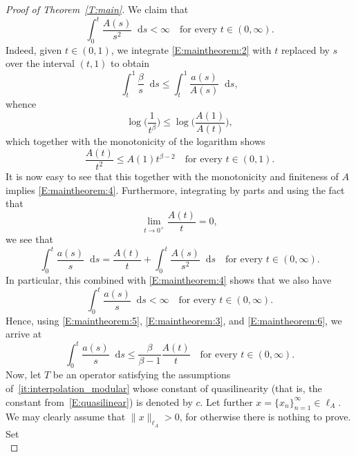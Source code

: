 \documentclass[nointlimits]{amsart}
\numberwithin{equation}{section}
\theoremstyle{plain}
\theoremstyle{definition}
\newcommand{\lA}{\ell_A}
\newcommand*\dd{\mathop{}\!\mathrm{d}}
\begin{document}
\begin{proof}[Proof of Theorem~\ref{T:main}]
We claim that
\begin{equation}\label{E:maintheorem:4}
    \int_0^t \frac{A(s)}{s^2} \dd s < \infty \quad \text{for every $t\in(0, \infty)$}.
\end{equation}
Indeed, given $t\in(0, 1)$, we integrate \eqref{E:maintheorem:2} with $t$ replaced by $s$ over the interval $(t, 1)$ to obtain
\begin{equation*}
    \int_t^1 \frac{\beta}{s} \dd s \leq \int_t^1 \frac{a(s)}{A(s)} \dd s,
\end{equation*}
whence
\begin{equation*}
    \log\Big( \frac1{t^\beta} \Big) \leq \log\Big( \frac{A(1)}{A(t)} \Big),
\end{equation*}
which together with the monotonicity of the logarithm shows
\begin{equation*}
    \frac{A(t)}{t^2} \leq A(1) t^{\beta-2} \quad \text{for every $t\in(0,1)$}.
\end{equation*}
It is now easy to see that this together with the monotonicity and finiteness of $A$ implies \eqref{E:maintheorem:4}. Furthermore, integrating by parts and using the fact that
\begin{equation*}
    \lim_{t\to 0^+} \frac{A(t)}{t} = 0,
\end{equation*}
we see that
\begin{equation}\label{E:maintheorem:5}
    \int_0^t \frac{a(s)}{s} \dd s  = \frac{A(t)}{t} + \int_0^t \frac{A(s)}{s^2} \dd s \quad \text{for every $t\in(0, \infty)$}.
\end{equation}
In particular, this combined with \eqref{E:maintheorem:4} shows that we also have
\begin{equation}\label{E:maintheorem:6}
    \int_0^t \frac{a(s)}{s} \dd s < \infty \quad \text{for every $t\in(0, \infty)$}.
\end{equation}
Hence, using \eqref{E:maintheorem:5}, \eqref{E:maintheorem:3}, and \eqref{E:maintheorem:6}, we arrive at
\begin{equation}\label{E:maintheorem:7}
    \int_0^t \frac{a(s)}{s} \dd s \leq \frac{\beta}{\beta - 1}\frac{A(t)}{t} \quad \text{for every $t\in(0, \infty)$}.
\end{equation}
Now, let $T$ be an operator satisfying the assumptions of~\ref{it:interpolation_modular} whose constant of quasilinearity (that is, the constant  from~\eqref{E:quasilinear}) is denoted by $c$. Let further $x = \{x_n\}_{n=1}^\infty\in \lA$. We may clearly assume that $\|x\|_{\lA} > 0$, for otherwise there is nothing to prove. Set
\begin{equation*}

\end{equation*}
\end{proof}
\end{document}
